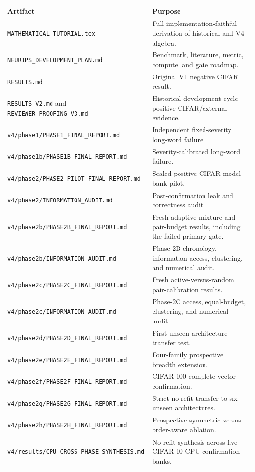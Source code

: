 \documentclass[11pt,a4paper]{article}
\begin{document}
\begin{center}
\begin{tabular}{P{5.0cm}P{9.5cm}}
\toprule
\textbf{Artifact} & \textbf{Purpose}\\
\midrule
\texttt{MATHEMATICAL\_TUTORIAL.tex} & Full implementation-faithful derivation of historical and V4 algebra.\\
\texttt{NEURIPS\_DEVELOPMENT\_PLAN.md} & Benchmark, literature, metric, compute, and gate roadmap.\\
\texttt{RESULTS.md} & Original V1 negative CIFAR result.\\
\texttt{RESULTS\_V2.md} and \texttt{REVIEWER\_PROOFING\_V3.md} & Historical development-cycle positive CIFAR/external evidence.\\
\texttt{v4/phase1/PHASE1\_FINAL\_REPORT.md} & Independent fixed-severity long-word failure.\\
\texttt{v4/phase1b/PHASE1B\_FINAL\_REPORT.md} & Severity-calibrated long-word failure.\\
\texttt{v4/phase2/PHASE2\_PILOT\_FINAL\_REPORT.md} & Sealed positive CIFAR model-bank pilot.\\
\texttt{v4/phase2/INFORMATION\_AUDIT.md} & Post-confirmation leak and correctness audit.\\
\texttt{v4/phase2b/PHASE2B\_FINAL\_REPORT.md} & Fresh adaptive-mixture and pair-budget results, including the failed primary gate.\\
\texttt{v4/phase2b/INFORMATION\_AUDIT.md} & Phase-2B chronology, information-access, clustering, and numerical audit.\\
\texttt{v4/phase2c/PHASE2C\_FINAL\_REPORT.md} & Fresh active-versus-random pair-calibration results.\\
\texttt{v4/phase2c/INFORMATION\_AUDIT.md} & Phase-2C access, equal-budget, clustering, and numerical audit.\\
\texttt{v4/phase2d/PHASE2D\_FINAL\_REPORT.md} & First unseen-architecture transfer test.\\
\texttt{v4/phase2e/PHASE2E\_FINAL\_REPORT.md} & Four-family prospective breadth extension.\\
\texttt{v4/phase2f/PHASE2F\_FINAL\_REPORT.md} & CIFAR-100 complete-vector confirmation.\\
\texttt{v4/phase2g/PHASE2G\_FINAL\_REPORT.md} & Strict no-refit transfer to six unseen architectures.\\
\texttt{v4/phase2h/PHASE2H\_FINAL\_REPORT.md} & Prospective symmetric-versus-order-aware ablation.\\
\texttt{v4/results/CPU\_CROSS\_PHASE\_SYNTHESIS.md} & No-refit synthesis across five CIFAR-10 CPU confirmation banks.\\
\bottomrule
\end{tabular}
\end{center}
\end{document}
